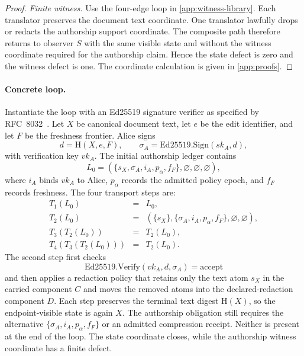 \documentclass[11pt,twoside]{article}
\theoremstyle{definition}
\begin{document}
\begin{proof}
\textit{Finite witness.}
Use the four-edge loop in \cref{app:witness-library}. Each translator preserves
the document text coordinate. One translator lawfully drops or redacts the
authorship support coordinate. The composite path therefore returns to observer
$S$ with the same visible state and without the witness coordinate required for
the authorship claim. Hence the state defect is zero and the witness defect is
one. The coordinate calculation is given in \cref{app:proofs}.
\end{proof}

\paragraph{Concrete loop.}
Instantiate the loop with an Ed25519 signature verifier as specified by
RFC~8032~\cite{rfc8032}. Let $X$ be canonical document text, let $e$ be the edit
identifier, and let $F$ be the freshness frontier. Alice signs
\[
  d=\mathrm{H}(X,e,F),
  \qquad
  \sigma_A=\mathrm{Ed25519.Sign}(sk_A,d),
\]
with verification key $vk_A$. The initial authorship ledger contains
\[
  L_0=(\{s_X,\sigma_A,i_A,p_\alpha,f_F\},\varnothing,\varnothing,\varnothing),
\]
where $i_A$ binds $vk_A$ to Alice, $p_\alpha$ records the admitted policy epoch,
and $f_F$ records freshness. The four transport steps are:
\[
\begin{array}{rcl}
T_1(L_0)&=&L_0,\\
T_2(L_0)&=&(\{s_X\},\{\sigma_A,i_A,p_\alpha,f_F\},\varnothing,\varnothing),\\
T_3(T_2(L_0))&=&T_2(L_0),\\
T_4(T_3(T_2(L_0)))&=&T_2(L_0).
\end{array}
\]
The second step first checks
\[
  \mathrm{Ed25519.Verify}(vk_A,d,\sigma_A)=\mathrm{accept}
\]
and then applies a redaction policy that retains only the text atom $s_X$ in the
carried component $C$ and moves the removed atoms into the declared-redaction
component $D$. Each step preserves the terminal text digest
$\mathrm{H}(X)$, so the endpoint-visible state is again $X$. The authorship
obligation still requires the alternative
$\{\sigma_A,i_A,p_\alpha,f_F\}$ or an admitted compression receipt. Neither is
present at the end of the loop. The state coordinate closes, while the
authorship witness coordinate has a finite defect.
\end{document}
